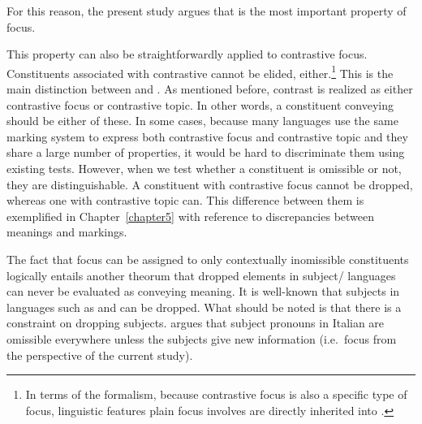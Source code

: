 \noindent For this reason, the present study argues that
 is the most important property of focus.



This property can also be straightforwardly applied to contrastive
focus. Constituents associated with contrastive  cannot be
elided, either.\footnote{In terms of the  formalism, because
  contrastive focus is also a specific type of focus, linguistic
  features plain focus involves are directly inherited into
  .} This is the main distinction between
 and . As mentioned
before, contrast is realized as either contrastive focus or
contrastive topic. In other words, a constituent conveying
 should be either of these. In some cases,
because many languages use the same marking system to express both
contrastive focus and contrastive topic and they share a large number
of properties, it would be hard to discriminate them using existing
tests. However, when we test whether a constituent is omissible or
not, they are distinguishable. A constituent with contrastive focus
cannot be dropped, whereas one with contrastive topic can. This
difference between them is exemplified in
Chapter~\ref{chapter5}  with reference to
discrepancies between meanings and markings.



The fact that focus can be assigned to only contextually inomissible
constituents logically entails another theorum that dropped elements
in subject/ languages can never be evaluated as
conveying  meaning.  It is well-known that subjects in
 languages such as  and 
can be dropped.  What should be noted is that there is a constraint on
dropping subjects. \citet[p.\ 406]{cinque:77} argues that subject
pronouns in Italian are omissible everywhere unless the subjects give
new information (i.e.\ focus from the perspective of the current
study).



